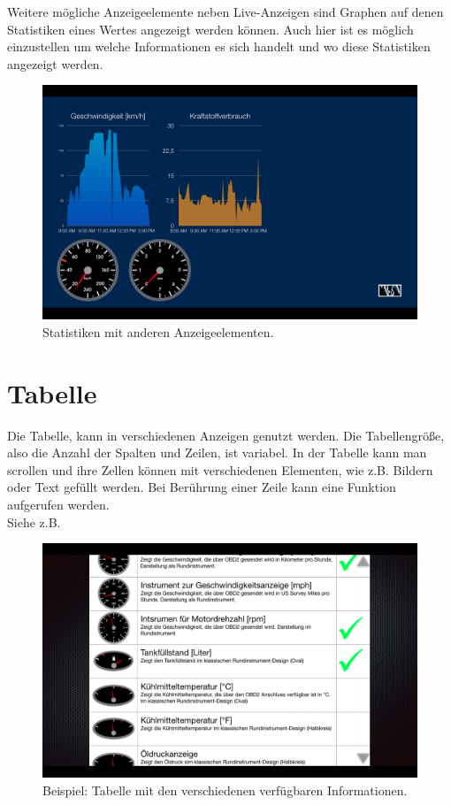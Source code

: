 \documentclass[pflichtenheft.tex]{subfiles}
\begin{document}
Weitere mögliche Anzeigeelemente neben Live-Anzeigen sind Graphen auf denen Statistiken eines Wertes angezeigt werden können. Auch hier ist es möglich einzustellen um welche Informationen es sich handelt und wo diese Statistiken angezeigt werden.
\begin{figure}[H]
  	\begin{center}
 		\includegraphics[width=\textwidth]{Images/GUI-DashStatistic.png}
  		\caption{Statistiken mit anderen Anzeigeelementen.}
  	\end{center}
\end{figure}

\clearpage
\section{Tabelle}

Die Tabelle, kann in verschiedenen Anzeigen genutzt werden. Die Tabellengröße, also die Anzahl der Spalten und Zeilen, ist variabel. In der Tabelle kann man scrollen und ihre Zellen können mit verschiedenen Elementen, wie z.B. Bildern oder Text gefüllt werden. Bei Berührung einer Zeile kann eine Funktion aufgerufen werden.\\
Siehe z.B. ~

\begin{figure}[H]
  	\begin{center}
 		\includegraphics[width=\textwidth]{Images/GUI-Table.png}
  		\caption{Beispiel: Tabelle mit den verschiedenen verfügbaren Informationen.}
  	\end{center}
\end{figure}
\end{document}
